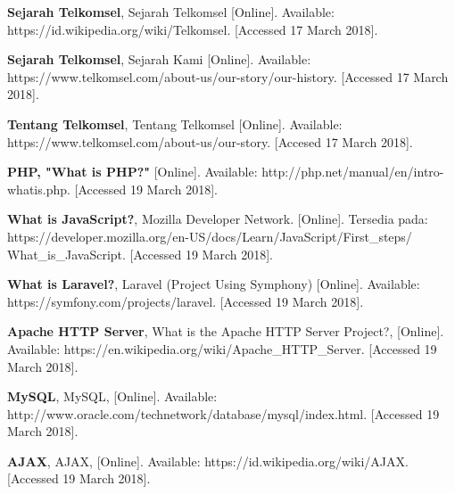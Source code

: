 \begin{thebibliography}{15}
	
	\textbf{Sejarah Telkomsel}, Sejarah Telkomsel [Online]. Available: https://id.wikipedia.org/wiki/Telkomsel. [Accessed 17 March 2018].
	
	\textbf {Sejarah Telkomsel}, Sejarah Kami [Online]. Available: https://www.telkomsel.com/about-us/our-story/our-history. [Accessed 17 March 2018].
	
	\textbf{Tentang Telkomsel}, Tentang Telkomsel [Online]. Available: https://www.telkomsel.com/about-us/our-story. [Accesed 17 March 2018].
	
	\textbf{PHP, "What is PHP?"} [Online]. Available: http://php.net/manual/en/intro-whatis.php. [Accessed 19 March 2018].		
	
	\textbf{What is JavaScript?}, Mozilla Developer Network. [Online]. Tersedia pada: https://developer.mozilla.org/en-US/docs/Learn/JavaScript/First\_steps/
	What\_is\_JavaScript. [Accessed 19 March 2018].
	
	\textbf{What is Laravel?}, Laravel (Project Using Symphony) [Online]. Available: https://symfony.com/projects/laravel. [Accessed 19 March 2018].
	
	\textbf {Apache HTTP Server}, What is the Apache HTTP Server Project?, [Online]. Available: https://en.wikipedia.org/wiki/Apache\_HTTP\_Server. [Accessed 19 March 2018].
	
	\textbf{MySQL}, MySQL, [Online]. Available: http://www.oracle.com/technetwork/database/mysql/index.html. [Accessed 19 March 2018].
	
	\textbf{AJAX}, AJAX, [Online]. Available: https://id.wikipedia.org/wiki/AJAX. [Accessed 19 March 2018].
\end{thebibliography}
